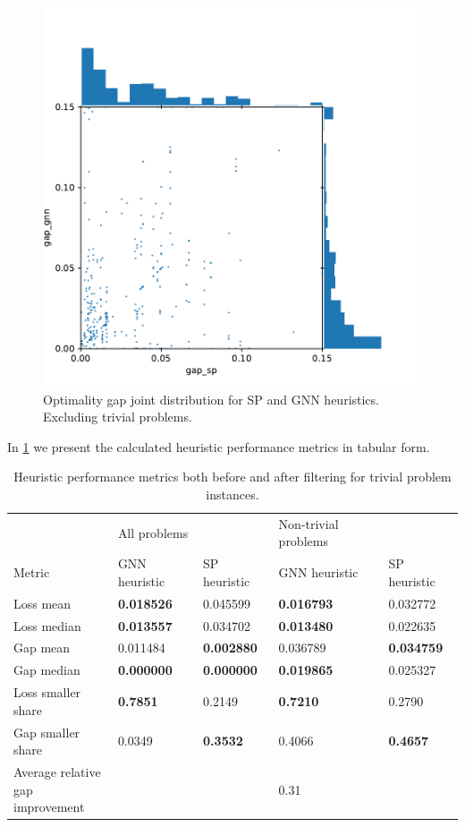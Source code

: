 \documentclass[english, 12pt, a4paper, sci, utf8, a-2b, online]{aaltothesis}
\begin{document}
\begin{figure}[t]
    \centering
    \includegraphics[width=0.75\linewidth]{figures/gap-gap-excl-trivials.pdf}
    \caption{Optimality gap joint distribution for SP and GNN heuristics. Excluding trivial problems.}
    \label{fig:results-gg-excl-trivial}
\end{figure}

In \cref{tab:results} we present the calculated heuristic performance metrics in tabular form.

\begin{table}[b]
    \centering
    \caption{Heuristic performance metrics both before and after filtering for trivial problem instances.}
    \label{tab:results}
    \footnotesize
    \begin{tabular}{l|ll|ll}
                                     & All problems  &                   & Non-trivial problems &                   \\
    Metric                           & GNN heuristic & SP heuristic & GNN heuristic        & SP heuristic \\ \hline
    Loss mean                        & \textbf{0.018526} & 0.045599          & \textbf{0.016793}    & 0.032772          \\
    Loss median                      & \textbf{0.013557} & 0.034702          & \textbf{0.013480}    & 0.022635          \\
    Gap mean                         & 0.011484          & \textbf{0.002880} & 0.036789             & \textbf{0.034759} \\
    Gap median                       & \textbf{0.000000} & \textbf{0.000000} & \textbf{0.019865}    & 0.025327          \\
    Loss smaller share               & \textbf{0.7851}   & 0.2149            & \textbf{0.7210}      & 0.2790            \\
    Gap smaller share                & 0.0349            & \textbf{0.3532}   & 0.4066               & \textbf{0.4657}   \\
    \makecell{Average relative\\gap improvement} &               &                   & 0.31                 &                  
    \end{tabular}
\end{table}
\end{document}
